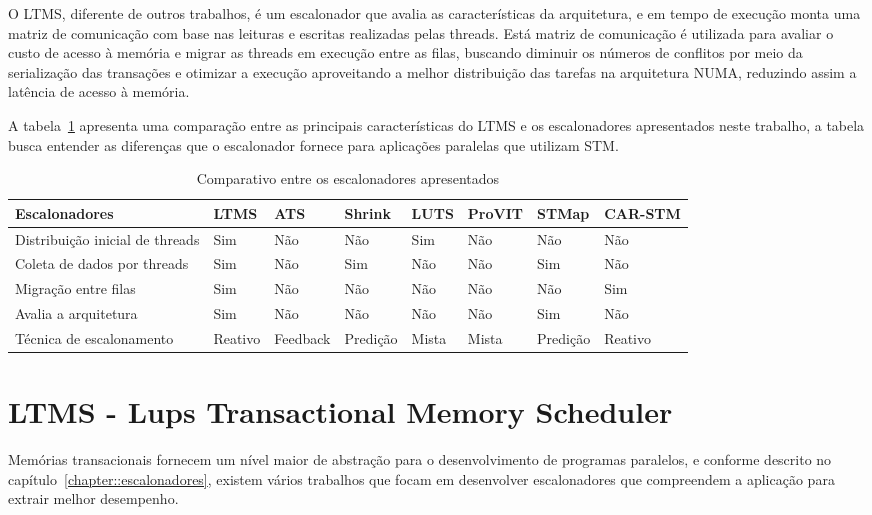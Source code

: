 \documentclass[diss,capa]{texufpel}
\begin{document}
O LTMS, diferente de outros trabalhos, é um escalonador que avalia as características da arquitetura, e em tempo de execução monta uma matriz de comunicação com base nas leituras e escritas realizadas pelas threads. Está matriz de comunicação é utilizada para avaliar o custo de acesso à memória e migrar as threads em execução entre as filas, buscando diminuir os números de conflitos por meio da serialização das transações e otimizar a execução aproveitando a melhor distribuição das tarefas na arquitetura NUMA, reduzindo assim a latência de acesso à memória.

A tabela~\ref{tab:compare_ltms} apresenta uma comparação entre as principais características do LTMS e os escalonadores apresentados neste trabalho, a tabela busca entender as diferenças que o escalonador fornece para aplicações paralelas que utilizam STM.

\begin{table}[]
 \footnotesize
 \centering
 \caption{Comparativo entre os escalonadores apresentados}
 \label{tab:compare_ltms}
 \begin{tabular}{l|l|l|l|l|l|l|l}
 \hline
  Escalonadores                     & LTMS    & ATS      & Shrink   & LUTS  & ProVIT  & STMap     & CAR-STM \\ \hline %
  Distribuição inicial de threads   & Sim     & Não      & Não      & Sim   & Não     & Não       & Não \\
  Coleta de dados por threads       & Sim     & Não      & Sim      & Não   & Não     & Sim       & Não \\
  Migração entre filas              & Sim     & Não      & Não      & Não   & Não     & Não       & Sim \\
  Avalia a arquitetura              & Sim     & Não      & Não      & Não   & Não     & Sim       & Não \\
  Técnica de escalonamento          & Reativo & Feedback & Predição & Mista & Mista   & Predição  & Reativo  \\
 \hline
 \end{tabular}
\end{table}

\chapter{LTMS - Lups Transactional Memory Scheduler}
\label{chapter::ltms}

Memórias transacionais fornecem um nível maior de abstração para o desenvolvimento de programas paralelos, e conforme descrito no capítulo~\ref{chapter::escalonadores}, existem vários trabalhos que focam em desenvolver escalonadores que compreendem a aplicação para extrair melhor desempenho.
\end{document}
